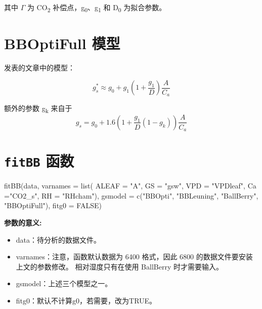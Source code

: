 \documentclass[
]{krantz}
\makeatletter
\newenvironment{Shaded}{\begin{snugshade}}{\end{snugshade}}
\newcommand{\AttributeTok}[1]{\textcolor[rgb]{0.77,0.63,0.00}{#1}}
\newcommand{\ConstantTok}[1]{\textcolor[rgb]{0.00,0.00,0.00}{#1}}
\newcommand{\FunctionTok}[1]{\textcolor[rgb]{0.00,0.00,0.00}{#1}}
\newcommand{\NormalTok}[1]{#1}
\newcommand{\StringTok}[1]{\textcolor[rgb]{0.31,0.60,0.02}{#1}}
\providecommand{\tightlist}{%
  \setlength{\itemsep}{0pt}\setlength{\parskip}{0pt}}
\newenvironment{kframe}{%
\medskip{}
\setlength{\fboxsep}{.8em}
 \def\at@end@of@kframe{}%
 \ifinner\ifhmode%
  \def\at@end@of@kframe{\end{minipage}}%
  \begin{minipage}{\columnwidth}%
 \fi\fi%
 \def\FrameCommand##1{\hskip\@totalleftmargin \hskip-\fboxsep
 \colorbox{shadecolor}{##1}\hskip-\fboxsep
     \hskip-\linewidth \hskip-\@totalleftmargin \hskip\columnwidth}%
 \MakeFramed {\advance\hsize-\width
   \@totalleftmargin\z@ \linewidth\hsize
   \@setminipage}}%
 {\par\unskip\endMakeFramed%
 \at@end@of@kframe}
\renewenvironment{Shaded}{\begin{kframe}}{\end{kframe}}
\makeatother
\begin{document}
其中 \(\Gamma\) 为 CO\textsubscript{2} 补偿点，g\textsubscript{0}、g\textsubscript{1} 和 D\textsubscript{0} 为拟合参数。

\hypertarget{bboptifull}{%
\section{BBOptiFull 模型}\label{bboptifull}}

\citet{Medlyn2011Reconciling} 发表的文章中的模型：

\begin{equation}
g_s^* \approx g_0 + g_1(1 + \frac{g_1}{D}) \frac{A}{C_a}
\label{eq:BBOptiFull}
\end{equation}

额外的参数 g\textsubscript{k} 来自于 \citet{Duursma2013Near}
\begin{equation}
g_s = g_0 + 1.6(1 + \frac{g_1}{D}(1-g_k)) \frac{A}{C_a}
\label{eq:Duursm}
\end{equation}

\hypertarget{fitbb-p}{%
\section{\texorpdfstring{\texttt{fitBB} 函数}{fitBB 函数}}\label{fitbb-p}}

\begin{Shaded}
\begin{Highlighting}[]
\FunctionTok{fitBB}\NormalTok{(data, }\AttributeTok{varnames =} \FunctionTok{list}\NormalTok{(}
  \AttributeTok{ALEAF =} \StringTok{"A"}\NormalTok{, }\AttributeTok{GS =} \StringTok{"gsw"}\NormalTok{, }\AttributeTok{VPD =} \StringTok{"VPDleaf"}\NormalTok{,}
  \AttributeTok{Ca =}\StringTok{"CO2\_s"}\NormalTok{, }\AttributeTok{RH =} \StringTok{"RHcham"}\NormalTok{), }
  \AttributeTok{gsmodel =} \FunctionTok{c}\NormalTok{(}\StringTok{"BBOpti"}\NormalTok{, }\StringTok{"BBLeuning"}\NormalTok{, }\StringTok{"BallBerry"}\NormalTok{,}
              \StringTok{"BBOptiFull"}\NormalTok{), }\AttributeTok{fitg0 =} \ConstantTok{FALSE}\NormalTok{)}
\end{Highlighting}
\end{Shaded}

\textbf{参数的意义:}

\begin{itemize}
\tightlist
\item
  data：待分析的数据文件。
\item
  varnames：注意，函数默认数据为 6400 格式，因此 6800 的数据文件要安装上文的参数修改。 相对湿度只有在使用 BallBerry 时才需要输入。
\item
  gsmodel：上述三个模型之一。
\item
  fitg0：默认不计算g0，若需要，改为TRUE。
\end{itemize}
\end{document}
